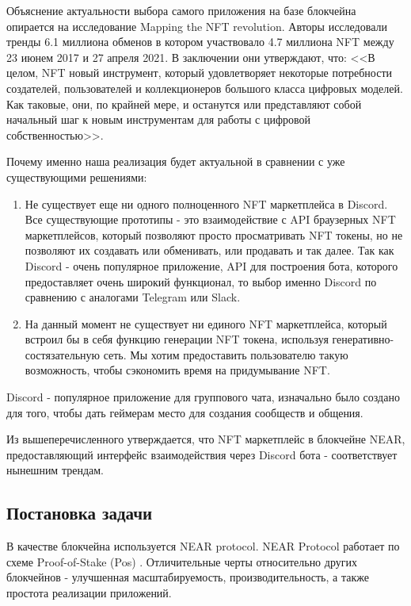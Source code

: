 Объяснение актуальности выбора самого приложения на базе блокчейна опирается на исследование Mapping the NFT revolution\cite{nftrevolution}. Авторы исследовали тренды 6.1 миллиона обменов в котором участвовало 4.7 миллиона NFT между 23 июнем 2017 и 27 апреля 2021. В заключении они утверждают, что: <<В целом, NFT новый инструмент, который удовлетворяет некоторые потребности создателей, пользователей и коллекционеров большого класса цифровых моделей. Как таковые, они, по крайней мере, и останутся или представляют собой начальный шаг к новым инструментам для работы с цифровой собственностью>>.

Почему именно наша реализация будет актуальной в сравнении с уже существующими решениями:


\begin{enumerate}
	\item Не существует еще ни одного полноценного NFT маркетплейса в Discord. Все существующие прототипы - это взаимодействие с API браузерных NFT маркетплейсов, который позволяют просто просматривать NFT токены, но не позволяют их создавать или обменивать, или продавать и так далее.
    Так как Discord - очень популярное приложение, API для построения бота, которого предоставляет очень широкий функционал, то выбор именно Discord по сравнению с аналогами Telegram или Slack.
	\item На данный момент не существует ни единого NFT маркетплейса, который встроил бы в себя функцию генерации NFT токена, используя генеративно-состязательную сеть. Мы хотим предоставить пользователю такую возможность, чтобы сэкономить время на придумывание NFT.
\end{enumerate}

\begin{definition}
    Discord - популярное приложение для группового чата, изначально было создано для того, чтобы дать геймерам место для создания сообществ и общения.
\end{definition}

Из вышеперечисленного утверждается, что NFT маркетплейс в блокчейне NEAR, предоставляющий интерфейс взаимодействия через Discord бота - соответствует нынешним трендам.


\subsection{Постановка задачи}
В качестве блокчейна используется NEAR protocol\cite{nearprotocol_2022}. NEAR Protocol работает по схеме Proof-of-Stake (Pos) \cite{nearprotocolpos}. Отличительные черты относительно других блокчейнов - улучшенная масштабируемость, производительность, а также простота реализации приложений.

